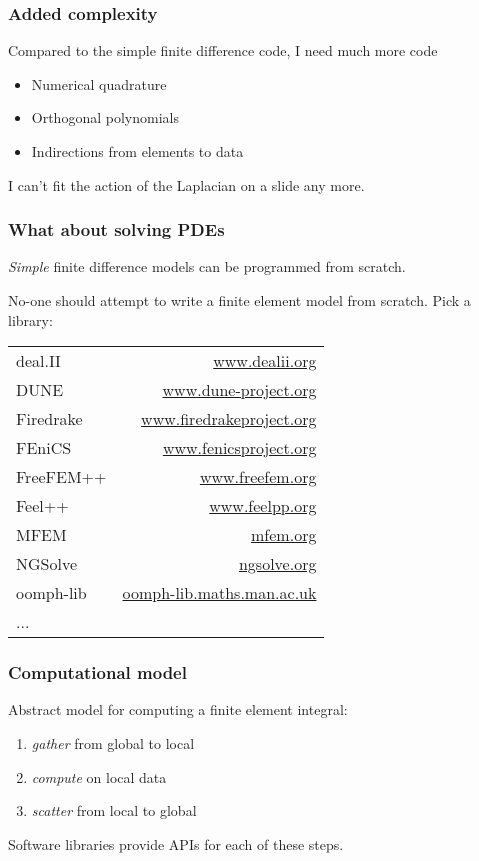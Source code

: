 \documentclass[presentation]{beamer}
\begin{document}
\begin{frame}
  \frametitle{Added complexity}
  Compared to the simple finite difference code, I need much more code

  \begin{itemize}
  \item Numerical quadrature
  \item Orthogonal polynomials
  \item Indirections from elements to data
  \end{itemize}

  I can't fit the action of the Laplacian on a slide any more.
\end{frame}

\begin{frame}
  \frametitle{What about solving PDEs}
  \emph{Simple} finite difference models can be programmed from scratch.

  No-one should attempt to write a finite element model from
  scratch. Pick a library:
  \begin{center}
    \small
    \begin{tabular}{lr}
      deal.II   & \url{www.dealii.org}            \\
      DUNE      & \url{www.dune-project.org}      \\
      Firedrake & \url{www.firedrakeproject.org}  \\
      FEniCS    & \url{www.fenicsproject.org}     \\
      FreeFEM++ & \url{www.freefem.org}           \\
      Feel++    & \url{www.feelpp.org}            \\
      MFEM      & \url{mfem.org}                  \\
      NGSolve   & \url{ngsolve.org}               \\
      oomph-lib & \url{oomph-lib.maths.man.ac.uk} \\
      ...       &                                 \\
    \end{tabular}
  \end{center}
\end{frame}

\begin{frame}
  \frametitle{Computational model}
  Abstract model for computing a finite element
  integral:
  \begin{enumerate}
  \item \emph{gather} from global to local
  \item \emph{compute} on local data
  \item \emph{scatter} from local to global
  \end{enumerate}

  Software libraries provide APIs for each of these steps.
\end{frame}
\end{document}
